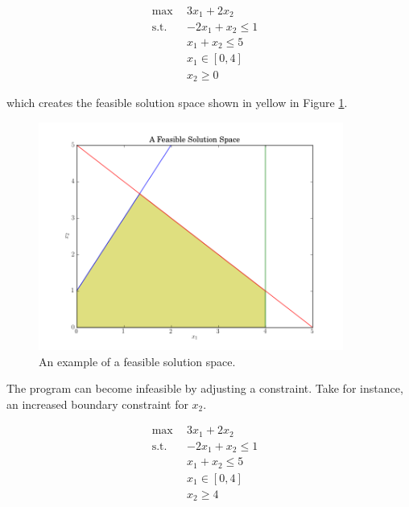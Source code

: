 \begin{subequations}\label{eqs:feas}
  \begin{align}
    \max \:\: & 
    3 x_1 + 2 x_2
    & \label{eqs:feas_obj} \\
    \text{s.t.} \:\: &
    -2 x_1 + x_2 \leq 1 \\
    &
    x_1 + x_2 \leq 5 
    & \label{eqs:feas_sup} \\
    &
    x_1 \in [0, 4]
    &\label{eqs:feas_x1} \\
    &
    x_2 \geq 0
    &\label{eqs:feas_x2}
  \end{align}
\end{subequations}

which creates the feasible solution space shown in yellow in
Figure \ref{fig:feasible}.

\begin{figure}[H]
  \begin{center}
    \includegraphics[height=7.5cm]{./backmatter/figs/feasible.png}
  \caption{An example of a feasible solution space.}
  \label{fig:feasible}
  \end{center}
\end{figure}

The program can become infeasible by adjusting a constraint. Take for instance,
an increased boundary constraint for $x_2$.

\begin{subequations}\label{eqs:infeas}
  \begin{align}
    \max \:\: & 
    3 x_1 + 2 x_2
    & \label{eqs:infeas_obj} \\
    \text{s.t.} \:\: &
    -2 x_1 + x_2 \leq 1 \\
    &
    x_1 + x_2 \leq 5 
    & \label{eqs:infeas_sup} \\
    &
    x_1 \in [0, 4]
    &\label{eqs:infeas_x1} \\
    &
    x_2 \geq 4
    &\label{eqs:infeas_x2}
  \end{align}
\end{subequations}

